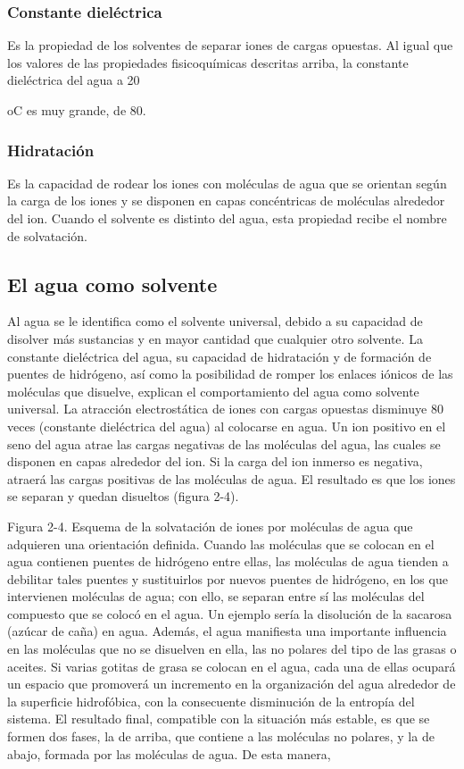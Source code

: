 \subsubsection{Constante dieléctrica}

Es la propiedad de los solventes de separar iones de cargas
opuestas. Al igual que los valores de las propiedades fisicoquímicas descritas arriba, la
constante dieléctrica del agua a 20

oC es muy grande, de 80.

\subsubsection{Hidratación}

Es la capacidad de rodear los iones con moléculas de agua que se
orientan según la carga de los iones y se disponen en capas concéntricas de moléculas
alrededor del ion. Cuando el solvente es distinto del agua, esta propiedad recibe el
nombre de solvatación.

\subsection{El agua como solvente}

Al agua se le identifica como el solvente universal, debido a su capacidad de disolver más
sustancias y en mayor cantidad que cualquier otro solvente. La constante dieléctrica del
agua, su capacidad de hidratación y de formación de puentes de hidrógeno, así como la
posibilidad de romper los enlaces iónicos de las moléculas que disuelve, explican el
comportamiento del agua como solvente universal.
La atracción electrostática de iones con cargas opuestas disminuye 80 veces (constante
dieléctrica del agua) al colocarse en agua. Un ion positivo en el seno del agua atrae las
cargas negativas de las moléculas del agua, las cuales se disponen en capas alrededor del
ion. Si la carga del ion inmerso es negativa, atraerá las cargas positivas de las moléculas
de agua. El resultado es que los iones se separan y quedan disueltos (figura 2-4).

Figura 2-4. Esquema de la solvatación de iones por moléculas de agua que adquieren una orientación definida.
Cuando las moléculas que se colocan en el agua contienen puentes de hidrógeno entre
ellas, las moléculas de agua tienden a debilitar tales puentes y sustituirlos por nuevos
puentes de hidrógeno, en los que intervienen moléculas de agua; con ello, se separan
entre sí las moléculas del compuesto que se colocó en el agua. Un ejemplo sería la
disolución de la sacarosa (azúcar de caña) en agua.
Además, el agua manifiesta una importante influencia en las moléculas que no se
disuelven en ella, las no polares del tipo de las grasas o aceites. Si varias gotitas de grasa
se colocan en el agua, cada una de ellas ocupará un espacio que promoverá un
incremento en la organización del agua alrededor de la superficie hidrofóbica, con la
consecuente disminución de la entropía del sistema. El resultado final, compatible con la
situación más estable, es que se formen dos fases, la de arriba, que contiene a las
moléculas no polares, y la de abajo, formada por las moléculas de agua. De esta manera,

